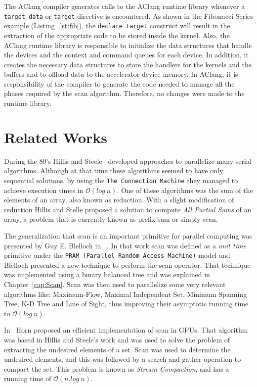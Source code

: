\documentclass[Ingles]{ic-tese-v1}
\newcommand{\rcap}[1]{Chapter~\ref{cap:#1}}
\newcommand{\ttt}[1]{{\texttt{#1}}}
\newcommand{\rlst}[1]{Listing~\ref{lst:#1}}
\begin{document}
The AClang compiler generates calls to  the AClang runtime library whenever a
\ttt{target data}  or \ttt{target}  directive is encountered.   As shown  in  the Fibonacci
Series example (\rlst{fib}),  the \ttt{declare  target}
construct will result in the extraction  of the appropriate code to be
stored  inside  the  kernel.  Also,  the  AClang  runtime  library  is
responsible to initialize the data  structures that handle the devices
and the context  and command queues for each device.   In addition, it
creates the  necessary data structures  to store the handlers  for the
kernels and the buffers and to offload data to the accelerator device
memory.  In AClang, it is responsibility of the compiler to generate
the  code needed  to manage  all the  phases required by  the scan  algorithm.
Therefore, no changes were made to the runtime library.

\chapter{Related Works}
\label{cap:RelatedWorks}
During  the 80's  Hillis and  Steele~\cite{dataparallel} developed
approaches to parallelize many serial  algorithms. Although at that time
these algorithms  seemed to have only  sequential solutions, by  using the
\ttt{The  Connection Machine}  \cite{themachine} they  managed to achieve
execution times in $\mathcal{O}(log\ n)$.  One of these algorithms was
the sum of  the elements of an  array, also known as  reduction.  With a
slight modification of reduction Hillis and Stelle proposed a solution
to compute \textit{All Partial Sums} of an array,  a problem that
is currently known as prefix sum or simply scan.

The generalization that scan is an important  primitive
for  parallel  computing  was  presented   by  Guy  E.   Blelloch  in
~\cite{ScanAsPrimitive}. In  that work scan was  defined as a
\textit{unit time}  primitive under the \texttt{PRAM  (Parallel Random
	Access Machine)}  model and  Blelloch presented  a new  technique to
perform  the scan  operator. That  technique was  implemented using  a
binary balanced tree  and was explained in  \rcap{Scan}.  Scan
was  then used   to  parallelize   some  very  relevant   algorithms  like:
Maximum-Flow, Maximal Independent Set, Minimum Spanning Tree, K-D Tree
and Line  of Sight,  thus improving their  asymptotic running  time to
$\mathcal{O}(log\ n)$.

In~\cite{GPUGems2}  Horn  proposed  an  efficient
implementation of  scan in GPUs.   That algorithm was based  in Hillis
and Steele's work and was used  to solve the problem of extracting the
undesired elements  of a set.  Scan  was used to
determine  the undesired elements, and this was followed by a search
and  gather   operation  to   compact the set.  This   problem  is   known  as
\textit{Stream   Compaction},  and has a running  time   of
$\mathcal{O}(n.log\ n)$.
\end{document}
